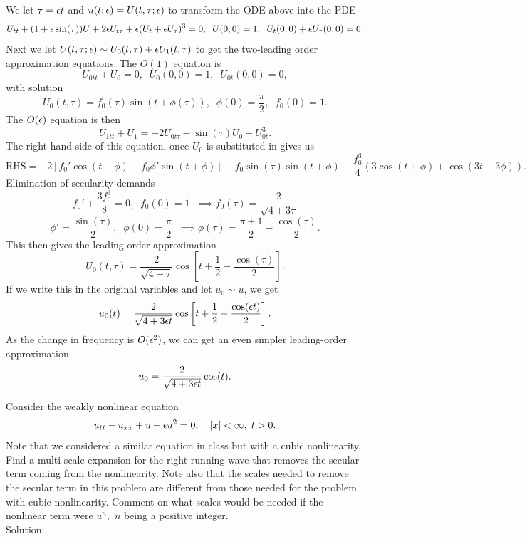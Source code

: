 We let $\tau=\epsilon t$ and $u(t;\epsilon)=U(t,\tau;\epsilon)$ to transform the ODE above into the PDE
$$U_{tt}+(1+\epsilon\sin(\tau))U+2\epsilon U_{t\tau}+\epsilon(U_t+\epsilon U_{\tau})^3=0,\;\;U(0,0)=1,\;\;U_t(0,0)+\epsilon U_{\tau}(0,0)=0.$$
Next we let $U(t,\tau;\epsilon)\sim U_0(t,\tau)+\epsilon U_1(t,\tau)$ to get the two-leading order approximation equations. The $O(1)$ equation is
$$U_{0tt}+U_0=0,\;\; U_0(0,0)=1,\;\;U_{0t}(0,0)=0,$$
with solution
$$U_0(t,\tau)=f_0(\tau)\sin(t+\phi(\tau)),\;\; \phi(0)=\frac{\pi}{2},\;\;f_0(0)=1.$$
The $O(\epsilon)$ equation is then
$$U_{1tt}+U_1=-2U_{0t\tau}-\sin(\tau)U_0-U_{0t}^3.$$
The right hand side of this equation, once $U_0$ is substituted in gives us
$$\text{RHS}=-2[f_0'\cos(t+\phi)-f_0\phi'\sin(t+\phi)]-f_0\sin(\tau)\sin(t+\phi)-\frac{f_0^3}{4}(3\cos(t+\phi)+\cos(3t+3\phi)).$$
Elimination of secularity demands
$$f_0'+\frac{3f_0^3}{8}=0,\;\;f_0(0)=1\;\;\implies f_0(\tau)=\frac{2}{\sqrt{4+3\tau}}$$
$$\phi'=\frac{\sin(\tau)}{2},\;\; \phi(0)=\frac{\pi}{2}\;\;\implies \phi(\tau)=\frac{\pi+1}{2}-\frac{\cos(\tau)}{2}.$$
This then gives the leading-order approximation
$$U_0(t,\tau)=\frac{2}{\sqrt{4+\tau}}\cos\left[t+\frac{1}{2}-\frac{\cos(\tau)}{2}\right].$$
If we write this in the original variables and let $u_0\sim u$, we get
$$u_0(t)=\frac{2}{\sqrt{4+3\epsilon t}}\cos\left[t+\frac{1}{2}-\frac{\cos(\epsilon t)}{2}\right].$$
As the change in frequency is $O(\epsilon^2)$, we can get an even simpler leading-order approximation
$$u_0=\frac{2}{\sqrt{4+3\epsilon t}}\cos(t).$$


\item Consider the weakly nonlinear equation
\begin{equation*}
u_{tt} - u_{xx} + u + \epsilon u^2 = 0, \quad |x|<\infty, \; t>0.
\end{equation*}
Note that we considered a similar equation in class but with a cubic nonlinearity.  Find a multi-scale expansion for the right-running wave that removes the secular term coming from the nonlinearity.  Note also that the scales needed to remove the secular term in this problem are different from those needed for the problem with cubic nonlinearity.  Comment on what scales would be needed if the nonlinear term were $u^n,$ $n$ being a positive integer.\\

Solution:\\

